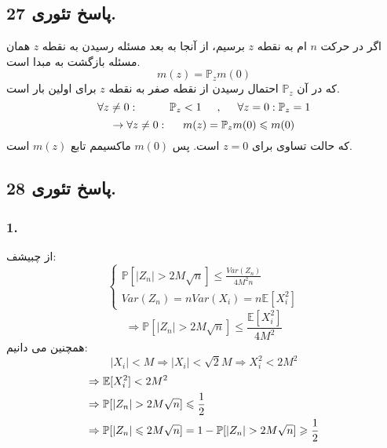 \documentclass[]{article}
\begin{document}
 \subsection{پاسخ تئوری 27.}
 اگر در حرکت $n$ ام به نقطه $z$ برسیم، از آنجا به بعد مسئله رسیدن به نقطه $z$ همان مسئله بازگشت به مبدا است.
 \begin{equation}
 	\nonumber
 	m(z) = \mathbb{P}_z m(0)
 \end{equation}
 که در آن 
 $\mathbb{P}_z$
 احتمال رسیدن از نقطه صفر به نقطه $z$ برای اولین بار است.
 \begin{equation}
 	\nonumber
 	\forall z \neq 0 : \hspace{1cm} \mathbb{P}_z < 1 \hspace{0.5cm} , \hspace{0.5cm} \forall z = 0 : \mathbb{P}_z = 1
 \end{equation}
 \begin{equation}
 	\nonumber
 	\rightarrow \forall z \neq 0 : \hspace{0.5cm} m(z) = \mathbb{P}_z m(0) \leqslant m(0)
 \end{equation}
 که حالت تساوی برای 
 $z = 0$
 است. پس 
 $m(0)$
 ماکسیمم تابع 
 $m(z)$
 است.
 \newpage
 \subsection{پاسخ تئوری 28.}
 \subsubsection{1.}
 از چبیشف:
 \begin{equation}
 	\nonumber
 	\begin{cases}
 		\mathbb{P}[|Z_n| > 2M\sqrt{n}] \leqslant \frac{Var(Z_n)}{4M^2n}\\  
 		Var(Z_n) = n Var(X_i) = n\mathbb{E}[X_i^2]
 	\end{cases}
 \end{equation}
 \begin{equation}
 	\nonumber
 	\Rightarrow \mathbb{P}[|Z_n| > 2M\sqrt{n}] \leqslant \frac{\mathbb{E}[X_i^2]}{4M^2}
 \end{equation}
 همچنین می دانیم:
 \begin{equation}
 	\nonumber
 	|X_i| < M \Rightarrow |X_i| < \sqrt{2} M \Rightarrow X_i^2 < 2M^2
 \end{equation}
 \begin{equation}
 	\nonumber
 	\begin{split}
 		\Rightarrow \hspace{0.1cm} &\mathbb{E}[X_i^2] < 2M^2\\	
 		\Rightarrow \hspace{0.1cm} &\mathbb{P}[|Z_n| > 2M\sqrt{n}] \leqslant \frac{1}{2}\\
 		\Rightarrow \hspace{0.1cm} &\mathbb{P}[|Z_n| \leqslant 2M\sqrt{n}] = 1 - \mathbb{P}[|Z_n| > 2M\sqrt{n}]\geqslant \frac{1}{2}
 	\end{split} 	
 \end{equation}
\end{document}
